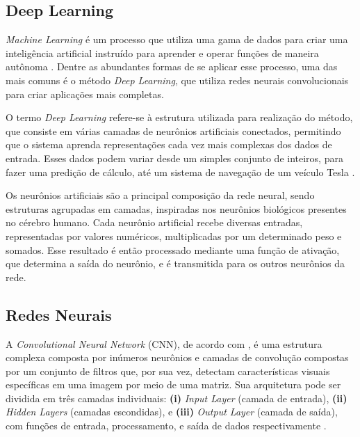 
\subsection{\esp Deep Learning}

\textit{Machine Learning} é um processo que utiliza uma gama de dados para criar uma inteligência artificial instruído para aprender e operar funções de maneira autônoma \cite{machinelearning}. Dentre as abundantes formas de se aplicar esse processo, uma das mais comuns é o método \textit{Deep Learning}, que utiliza redes neurais convolucionais para criar aplicações mais completas. 


O termo \textit{Deep Learning} refere-se à estrutura utilizada para realização do método, que consiste em várias camadas de neurônios artificiais conectados, permitindo que o sistema aprenda representações cada vez mais complexas dos dados de entrada. Esses dados podem variar desde um simples conjunto de inteiros, para fazer uma predição de cálculo, até um sistema de navegação de um veículo Tesla \cite{deeplearning}.

Os neurônios artificiais são a principal composição da rede neural, sendo estruturas agrupadas em camadas, inspiradas nos neurônios biológicos presentes no cérebro humano. Cada neurônio artificial recebe diversas entradas, representadas por valores numéricos, multiplicadas por um determinado peso e somados. Esse resultado é então processado mediante uma função de ativação, que determina a saída do neurônio, e é transmitida para os outros neurônios da rede.




\subsection{\esp Redes Neurais}


A \textit{Convolutional Neural Network} (CNN), de acordo com , é uma estrutura complexa composta por inúmeros neurônios e camadas de convolução compostas por um conjunto de filtros que, por sua vez, detectam características visuais específicas em uma imagem por meio de uma matriz. Sua arquitetura pode ser dividida em três camadas individuais: \textbf{(i)} \textit{Input Layer} (camada de entrada), \textbf{(ii)} \textit{Hidden Layers} (camadas escondidas), e \textbf{(iii)} \textit{Output Layer} (camada de saída), com funções de entrada, processamento, e saída de dados respectivamente \cite{medical}.

